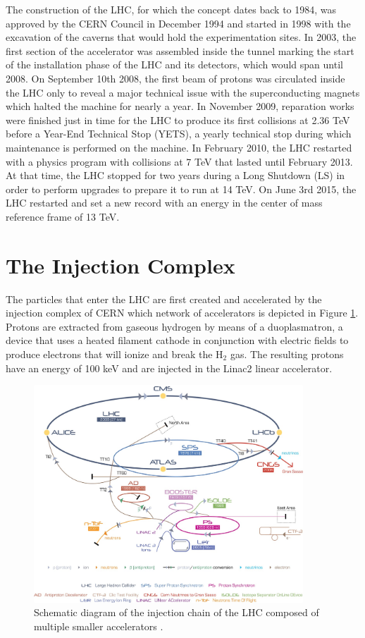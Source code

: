   The construction of the LHC, for which the concept dates back to 1984, was approved by the CERN Council in December 1994 and started in 1998 with the excavation of the caverns that would hold the experimentation sites. In 2003, the first section of the accelerator was assembled inside the tunnel marking the start of the installation phase of the LHC and its detectors, which would span until 2008. On September 10th 2008, the first beam of protons was circulated inside the LHC only to reveal a major technical issue with the superconducting magnets which halted the machine for nearly a year. In November 2009, reparation works were finished just in time for the LHC to produce its first collisions at 2.36 TeV before a Year-End Technical Stop (YETS), a yearly technical stop during which maintenance is performed on the machine. In February 2010, the LHC restarted with a physics program with collisions at 7 TeV that lasted until February 2013. At that time, the LHC stopped for two years during a Long Shutdown (LS) in order to perform upgrades to prepare it to run at 14 TeV. On June 3rd 2015, the LHC restarted and set a new record with an energy in the center of mass reference frame of 13 TeV.

  \section{The Injection Complex}

    The particles that enter the LHC are first created and accelerated by the injection complex of CERN which network of accelerators is depicted in Figure \ref{fig:I-2-injection-chain}. Protons are extracted from gaseous hydrogen by means of a duoplasmatron, a device that uses a heated filament cathode in conjunction with electric fields to produce electrons that will ionize and break the H$_2$ gas. The resulting protons have an energy of 100 keV and are injected in the Linac2 linear accelerator. \\

		\begin{figure}[b!]
			\centering
			\includegraphics[width=0.9\textwidth]{img/I-2-LHC/injectors.png}
			\caption{Schematic diagram of the injection chain of the LHC composed of multiple smaller accelerators \Cite{TE-EPC-LPC}.}
			\label{fig:I-2-injection-chain}
		\end{figure}

